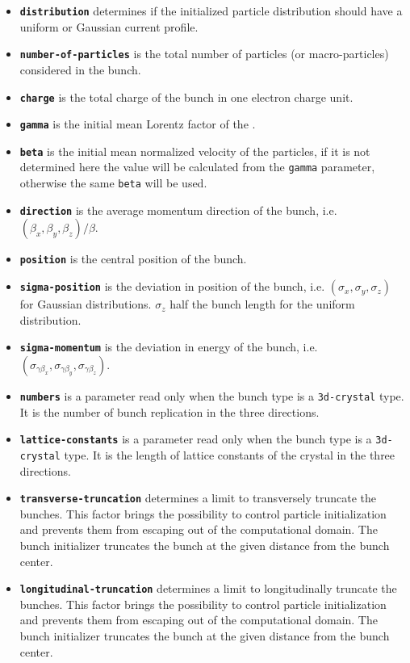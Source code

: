 \begin{enumerate}
\begin{itemize}
\begin{enumerate}
\end{enumerate}
\item \textbf{\texttt{distribution}} determines if the initialized particle distribution should have a uniform or Gaussian current profile.
\item \textbf{\texttt{number-of-particles}} is the total number of particles (or macro-particles) considered in the bunch.
\item \textbf{\texttt{charge}} is the total charge of the bunch in one electron charge unit.
\item \textbf{\texttt{gamma}} is the initial mean Lorentz factor of the .
\item \textbf{\texttt{beta}} is the initial mean normalized velocity of the particles, if it is not determined here the value will be calculated from the \texttt{gamma} parameter, otherwise the same \texttt{beta} will be used.
\item \textbf{\texttt{direction}} is the average momentum direction of the bunch, i.e. $(\beta_x, \beta_y, \beta_z)/\beta$.
\item \textbf{\texttt{position}} is the central position of the bunch.
\item \textbf{\texttt{sigma-position}} is the deviation in position of the bunch, i.e. $(\sigma_x, \sigma_y, \sigma_z)$ for Gaussian distributions. $\sigma_z$ half the bunch length for the uniform distribution.
\item \textbf{\texttt{sigma-momentum}} is the deviation in energy of the bunch, i.e. $(\sigma_{\gamma \beta_x}, \sigma_{\gamma \beta_y}, \sigma_{\gamma \beta_z})$.
\item \textbf{\texttt{numbers}} is a parameter read only when the bunch type is a \texttt{3d-crystal} type. It is the number of bunch replication in the three directions.
\item \textbf{\texttt{lattice-constants}} is a parameter read only when the bunch type is a \texttt{3d-crystal} type. It is the length of lattice constants of the crystal in the three directions.
\item \textbf{\texttt{transverse-truncation}} determines a limit to transversely truncate the bunches. This factor brings the possibility to control particle initialization and prevents them from escaping out of the computational domain. The bunch initializer truncates the bunch at the given distance from the bunch center.
\item \textbf{\texttt{longitudinal-truncation}} determines a limit to longitudinally truncate the bunches. This factor brings the possibility to control particle initialization and prevents them from escaping out of the computational domain. The bunch initializer truncates the bunch at the given distance from the bunch center.

\end{itemize}
\end{enumerate}
